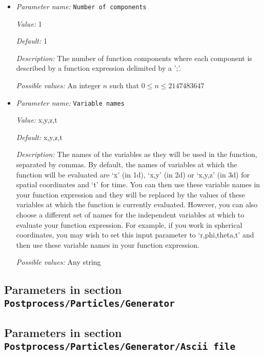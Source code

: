 \begin{itemize}
{\it Possible values:} Any string
\item {\it Parameter name:} {\tt Number of components}
\label{parameters:Postprocess/Particles/Function/Number of components}
\label{parameters:Postprocess/Particles/Function/Number_20of_20components}


{\it Value:} 1


{\it Default:} 1


{\it Description:} The number of function components where each component is described by a function expression delimited by a ';'.


{\it Possible values:} An integer $n$ such that $0\leq n \leq 2147483647$
\item {\it Parameter name:} {\tt Variable names}
\label{parameters:Postprocess/Particles/Function/Variable names}
\label{parameters:Postprocess/Particles/Function/Variable_20names}


{\it Value:} x,y,z,t


{\it Default:} x,y,z,t


{\it Description:} The names of the variables as they will be used in the function, separated by commas. By default, the names of variables at which the function will be evaluated are `x' (in 1d), `x,y' (in 2d) or `x,y,z' (in 3d) for spatial coordinates and `t' for time. You can then use these variable names in your function expression and they will be replaced by the values of these variables at which the function is currently evaluated. However, you can also choose a different set of names for the independent variables at which to evaluate your function expression. For example, if you work in spherical coordinates, you may wish to set this input parameter to `r,phi,theta,t' and then use these variable names in your function expression.


{\it Possible values:} Any string
\end{itemize}

\subsection{Parameters in section \tt Postprocess/Particles/Generator}
\label{parameters:Postprocess/Particles/Generator}


\subsection{Parameters in section \tt Postprocess/Particles/Generator/Ascii file}
\label{parameters:Postprocess/Particles/Generator/Ascii_20file}

